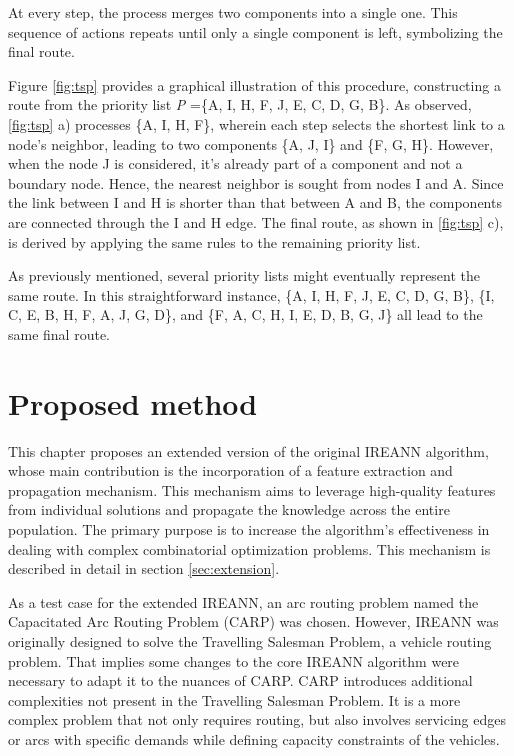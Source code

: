 \documentclass[twoside]{ctuthesis}
\theoremstyle{plain}
\theoremstyle{definition}
\theoremstyle{note}
\begin{document}
At every step, the process merges two components into a single one. This sequence of actions repeats until only a single component is left, symbolizing the final route.

Figure \ref{fig:tsp} provides a graphical illustration of this procedure, constructing a route from the priority list \emph{P} =\{A, I, H, F, J, E, C, D, G, B\}. As observed, \ref{fig:tsp} a) processes \{A, I, H, F\}, wherein each step selects the shortest link to a node's neighbor, leading to two components \{A, J, I\} and \{F, G, H\}. However, when the node J is considered, it's already part of a component and not a boundary node. Hence, the nearest neighbor is sought from nodes I and A. Since the link between I and H is shorter than that between A and B, the components are connected through the I and H edge. The final route, as shown in \ref{fig:tsp} c), is derived by applying the same rules to the remaining priority list.

As previously mentioned, several priority lists might eventually represent the same route. In this straightforward instance, \{A, I, H, F, J, E, C, D, G, B\}, \{I, C, E, B, H, F, A, J, G, D\}, and \{F, A, C, H, I, E, D, B, G, J\} all lead to the same final route.

\chapter{Proposed method}
\label{sec:proposedmethod}
This chapter proposes an extended version of the original IREANN algorithm, whose main contribution is the incorporation of a feature extraction and propagation mechanism. This mechanism aims to leverage high-quality features from individual solutions and propagate the knowledge across the entire population. The primary purpose is to increase the algorithm's effectiveness in dealing with complex combinatorial optimization problems. This mechanism is described in detail in section \ref{sec:extension}.

As a test case for the extended IREANN, an arc routing problem named the Capacitated Arc Routing Problem (CARP) was chosen. However, IREANN was originally designed to solve the Travelling Salesman Problem, a vehicle routing problem. That implies some changes to the core IREANN algorithm were necessary to adapt it to the nuances of CARP. CARP introduces additional complexities not present in the Travelling Salesman Problem. It is a more complex problem that not only requires routing, but also involves servicing edges or arcs with specific demands while defining capacity constraints of the vehicles.
\end{document}

